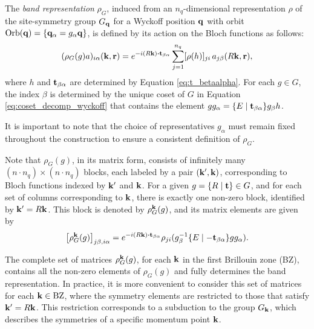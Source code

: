 \begin{definition} \label{def:band_representation}
The \textit{band representation} \(\rho_G\), induced from an \( n_q \)-dimensional representation \( \rho \) of the site-symmetry group \( G_{\vb{q}} \) for a Wyckoff position \( {\vb{q}} \) with orbit \(\text{Orb}({\vb{q}}) = \{ {\vb{q}}_\alpha = g_\alpha {\vb{q}} \} \), is defined by its action on the Bloch functions as follows:
\begin{equation} \label{eq:band_representation_definition}
(\rho_G(g) a)_{i\alpha}(\k,\r) = e^{-i(R\k)\vdot\t_{\beta\alpha}} \sum_{j=1}^{n_q} [\rho(h)]_{ji} \, a_{j\beta}(R\k, \r),
\end{equation}
where \( h \) and \( {\vb{t}}_{\beta\alpha} \) are determined by Equation \ref{eq:t_betaalpha}. For each \( g \in G \), the index \( \beta \) is determined by the unique coset of \( G \) in Equation \ref{eq:coset_decomp_wyckoff} that contains the element \( g g_\alpha = \{E \mid {\vb{t}}_{\beta\alpha}\} g_\beta h \).

It is important to note that the choice of representatives \( g_\alpha \) must remain fixed throughout the construction to ensure a consistent definition of \( \rho_G \).
\end{definition}

Note that \( \rho_G(g) \), in its matrix form, consists of infinitely many \( (n \cdot n_q) \times (n \cdot n_q) \) blocks, each labeled by a pair \( ({\vb{k}}', {\vb{k}}) \), corresponding to Bloch functions indexed by \( {\vb{k}}' \) and \( {\vb{k}} \). For a given \( g = \{ R \mid {\vb{t}} \} \in G \), and for each set of columns corresponding to \( {\vb{k}} \), there is exactly one non-zero block, identified by \( {\vb{k}}' = R{\vb{k}} \). This block is denoted by \( \rho_G^{\vb{k}}(g) \), and its matrix elements are given by
\begin{equation} \label{eq:k_block_inducedrep_jbia}
\qty[\rho_G^\k(g)]_{j\beta,i\alpha} = e^{-i(R\k)\vdot\t_{\beta\alpha}}\rho_{ji}(g_\beta^{-1}\sg{E}{-\t_{\beta\alpha}}gg_\alpha).
\end{equation}

The complete set of matrices \( \rho_G^{\vb{k}}(g) \), for each \( {\vb{k}} \) in the first Brillouin zone (BZ), contains all the non-zero elements of \( \rho_G(g) \) and fully determines the band representation. In practice, it is more convenient to consider this set of matrices for each \( {\vb{k}} \in \text{BZ} \), where the symmetry elements are restricted to those that satisfy \( {\vb{k}}' = R{\vb{k}} \). This restriction corresponds to a subduction to the group \( G_{\vb{k}} \), which describes the symmetries of a specific momentum point \( {\vb{k}} \).

